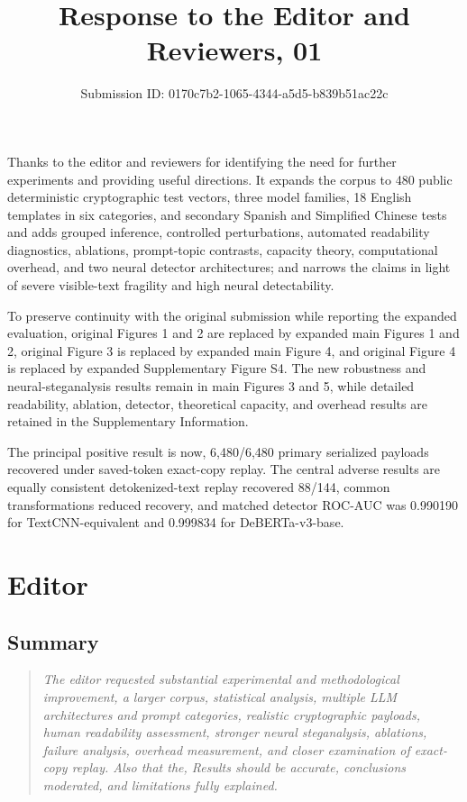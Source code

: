 \documentclass[11pt]{article}
\title{Response to the Editor and Reviewers, 01}
\author{Submission ID: 0170c7b2-1065-4344-a5d5-b839b51ac22c}
\newenvironment{reviewcomment}{\begin{quote}\color{commentgray}\itshape}{\end{quote}}
\begin{document}
\maketitle

 Thanks to the editor and reviewers for identifying the need for further experiments and providing useful directions. It expands the corpus to 480 public deterministic cryptographic test vectors, three model families, 18 English templates in six categories, and secondary Spanish and Simplified Chinese tests and adds grouped inference, controlled perturbations, automated readability diagnostics, ablations, prompt-topic contrasts, capacity theory, computational overhead, and two neural detector architectures; and narrows the claims in light of severe visible-text fragility and high neural detectability.

To preserve continuity with the original submission while reporting the expanded evaluation, original Figures 1 and 2 are replaced by expanded main Figures 1 and 2, original Figure 3 is replaced by expanded main Figure 4, and original Figure 4 is replaced by expanded Supplementary Figure S4. The new robustness and neural-steganalysis results remain in main Figures 3 and 5, while detailed readability, ablation, detector, theoretical capacity, and overhead results are retained in the Supplementary Information.

The principal positive result is now, 6,480/6,480 primary serialized payloads recovered under saved-token exact-copy replay. The central adverse results are equally consistent detokenized-text replay recovered 88/144, common transformations reduced recovery, and matched detector ROC-AUC was 0.990190 for TextCNN-equivalent and 0.999834 for DeBERTa-v3-base. 

\section*{Editor}

\subsection*{Summary}
\begin{reviewcomment}
The editor requested substantial experimental and methodological improvement, a larger corpus, statistical analysis, multiple LLM architectures and prompt categories, realistic cryptographic payloads, human readability assessment, stronger neural steganalysis, ablations, failure analysis, overhead measurement, and closer examination of exact-copy replay. Also that the, Results should be accurate, conclusions moderated, and limitations fully explained.
\end{reviewcomment}
\end{document}
